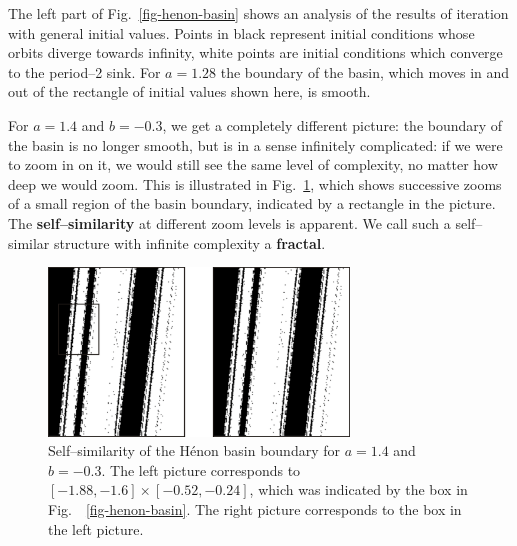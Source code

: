 The left part of Fig.~\ref{fig-henon-basin} shows an analysis of the results of iteration with general initial values. Points in black represent initial conditions whose orbits diverge towards infinity, white points are initial conditions which converge to the period--2 sink. For $a=1.28$ the boundary of the basin, which moves in and out of the rectangle of initial values shown here, is smooth.

For $a=1.4$ and $b=-0.3$, we get a completely different picture: the boundary of the basin is no longer smooth, but is in a sense infinitely complicated: if we were to zoom in on it, we would still see the same level of complexity, no matter how deep we would zoom. This is illustrated in Fig.~\ref{fig-henon-zoom}, which shows successive zooms of a small region of the basin boundary, indicated by a rectangle in the picture. The \textbf{self--similarity} at different zoom levels is apparent. We call such a self--similar structure with infinite complexity a \textbf{fractal}.

\begin{figure}[H]
\centering
\includegraphics[width=8cm]{dynamic/figures/henon_zoom}
\caption{Self--similarity of the H\'{e}non basin boundary for $a=1.4$ and $b=-0.3$. The left picture corresponds to $[-1.88,-1.6] \times [-0.52,-0.24]$, which was indicated by the box in Fig.~~\ref{fig-henon-basin}. The right picture corresponds to the box in the left picture.}
\label{fig-henon-zoom}
\end{figure} 


